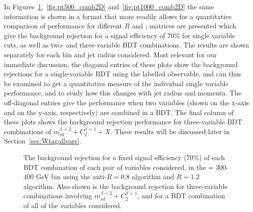  In
Figures~\ref{fig:pt300_comb2D},~\ref{fig:pt500_comb2D}
and~\ref{fig:pt1000_comb2D} the same information is shown in a format
that more readily allows for a quantitative comparison of performance
for different $R$ and \pT; matrices are presented which give the
background rejection for a signal efficiency of 70\% for single variable cuts, as well as two- and three-variable BDT combinations. The results are shown separately for each \pT bin and jet radius
considered.  Most relevant for our immediate discussion, the diagonal entries of these plots show the background
rejections for a single-variable BDT using the labelled observable, and can thus be examined to get a
quantitative measure of the individual single variable performance,
and to study how this changes with jet radius and momenta. The off-diagonal
entries give the performance when two variables (shown on the x-axis and on the y-axis, respectively) are combined in
a BDT. The
final column of these plots shows the background rejection
performance for three-variable BDT combinations of $m_{sd}^{\beta=2} +
C_2^{\beta=1} + X$. These results will be discussed later in Section~\ref{sec:Wtagallvars}. 

\begin{figure}
\centering
{}
\caption{
The background rejection
for a fixed signal efficiency (70\%) of each BDT combination of
each pair of variables considered, in the \pT = 300-400 GeV bin using the anti-\kT $R=0.8$
algorithm and $R=1.2$ algorithm. Also shown is the background
rejection for three-variable combinations involving $m_{sd}^{\beta=2} +
C_2^{\beta=1}$, and for a BDT combination of all of the variables considered.
}
\label{fig:pt300_comb2D}
\end{figure}


